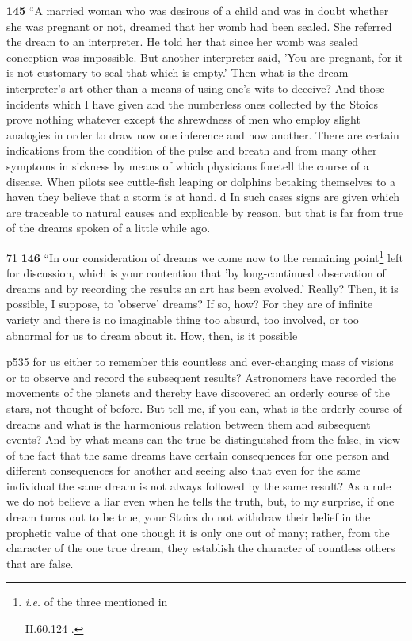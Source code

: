 \textbf{145} ``A married woman who was desirous of a child and was in doubt whether she was pregnant or not, dreamed that her womb had been sealed. She referred the dream to an interpreter. He told her that since her womb was sealed conception was impossible. But another interpreter said, 'You are pregnant, for it is not customary to seal that which is empty.' Then what is the dream-interpreter's art other than a means of using one's wits to deceive? And those incidents which I have given and the numberless ones collected by the Stoics prove nothing whatever except the shrewdness of men who employ slight analogies in order to draw now one inference and now another. There are certain indications from the condition of the pulse and breath and from many other symptoms in sickness by means of which physicians foretell the course of a disease. When pilots see cuttle-fish leaping or dolphins betaking themselves to a haven they believe that a storm is at hand.\texthebrew{} d In such cases signs are given which are traceable to natural causes and explicable by reason, but that is far from true of the dreams spoken of a little while ago.

71
\textbf{146} ``In our consideration of dreams we come now to the remaining point\texthebrew{}\footnote{\emph{i.e.} of the three mentioned in

II.60.124 .} left for discussion, which is your contention that 'by long-continued observation of dreams and by recording the results an art has been evolved.' Really? Then, it is possible, I suppose, to 'observe' dreams? If so, how? For they are of infinite variety and there is no imaginable thing too absurd, too involved, or too abnormal for us to dream about it. How, then, is it possible

p535 for us either to remember this countless and ever-changing mass of visions or to observe and record the subsequent results? Astronomers have recorded the movements of the planets and thereby have discovered an orderly course of the stars, not thought of before. But tell me, if you can, what is the orderly course of dreams and what is the harmonious relation between them and subsequent events? And by what means can the true be distinguished from the false, in view of the fact that the same dreams have certain consequences for one person and different consequences for another and seeing also that even for the same individual the same dream is not always followed by the same result? As a rule we do not believe a liar even when he tells the truth, but, to my surprise, if one dream turns out to be true, your Stoics do not withdraw their belief in the prophetic value of that one though it is only one out of many; rather, from the character of the one true dream, they establish the character of countless others that are false.

